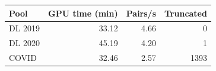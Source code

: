 \begin{tabular}{@{}lrrr@{}}
\toprule
Pool & GPU time (min) & Pairs/s & Truncated \\
\midrule
DL 2019 & 33.12 & 4.66 & 0 \\
DL 2020 & 45.19 & 4.20 & 1 \\
COVID & 32.46 & 2.57 & 1393 \\
\bottomrule
\end{tabular}
